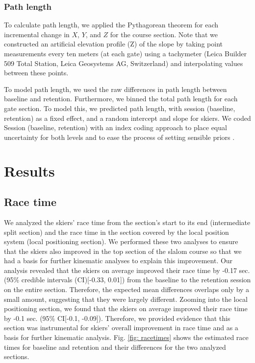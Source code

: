 \documentclass{article}
\begin{document}
\subsubsection{Path length}
To calculate path length, we applied the Pythagorean theorem for each incremental change in $X$, $Y$, and $Z$ for the course section. Note that we constructed an artificial elevation profile (Z) of the slope by taking point measurements every ten meters (at each gate) using a tachymeter (Leica Builder 509 Total Station, Leica Geosystems AG, Switzerland) and interpolating values between these points. 

To model path length, we used the raw differences in path length between baseline and retention. Furthermore, we binned the total path length for each gate section. To model this, we predicted path length, with session (baseline, retention) as a fixed effect, and a random intercept and slope for skiers. We coded Session (baseline, retention) with an index coding approach to place equal uncertainty for both levels and to ease the process of setting sensible priors \cite{mcelreath_statistical_2018}.

\section{Results}

\subsection{Race time}
We analyzed the skiers' race time from the section's start to its end (intermediate split section) and the race time in the section covered by the local position system (local positioning section). We performed these two analyses to ensure that the skiers also improved in the top section of the slalom course so that we had a basis for further kinematic analyses to explain this improvement. Our analysis revealed that the skiers on average improved their race time by -0.17 sec. (95\% credible intervals (CI)[-0.33, 0.01]) from the baseline to the retention session on the entire section. Therefore, the expected mean differences overlaps only by a small amount, suggesting that they were largely different. Zooming into the local positioning section, we found that the skiers on average improved their  race time by -0.1 sec. (95\% CI[-0.1, -0.09]). Therefore, we provided evidence that this section was instrumental for skiers’ overall improvement in race time and as a basis for further kinematic analysis. Fig. \ref{fig: racetimes} shows the estimated race times for baseline and retention and their differences for the two analyzed sections. 
\end{document}
